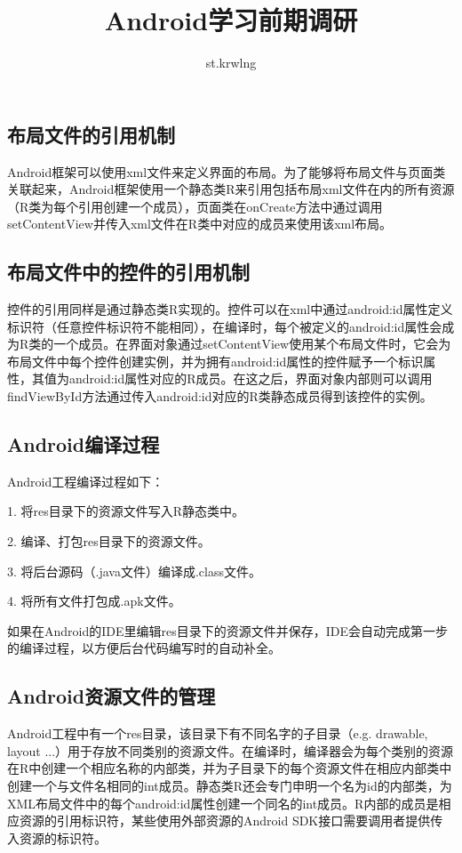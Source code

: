 \documentclass[UTF8]{ctexart}
\title{Android学习前期调研}
\author{st.krwlng}
\begin{document}
	\maketitle
	\tableofcontents
	\subsection{布局文件的引用机制} Android框架可以使用xml文件来定义界面的布局。为了能够将布局文件与页面类关联起来，Android框架使用一个静态类R来引用包括布局xml文件在内的所有资源（R类为每个引用创建一个成员），页面类在onCreate方法中通过调用setContentView并传入xml文件在R类中对应的成员来使用该xml布局。
	\subsection{布局文件中的控件的引用机制} 控件的引用同样是通过静态类R实现的。控件可以在xml中通过android:id属性定义标识符（任意控件标识符不能相同），在编译时，每个被定义的android:id属性会成为R类的一个成员。在界面对象通过setContentView使用某个布局文件时，它会为布局文件中每个控件创建实例，并为拥有android:id属性的控件赋予一个标识属性，其值为android:id属性对应的R成员。在这之后，界面对象内部则可以调用findViewById方法通过传入android:id对应的R类静态成员得到该控件的实例。
	\subsection{Android编译过程} Android工程编译过程如下：

	{1.} 将res目录下的资源文件写入R静态类中。

	{2.} 编译、打包res目录下的资源文件。

	{3.} 将后台源码（.java文件）编译成.class文件。

	{4.} 将所有文件打包成.apk文件。
	
	如果在Android的IDE里编辑res目录下的资源文件并保存，IDE会自动完成第一步的编译过程，以方便后台代码编写时的自动补全。
	\subsection{Android资源文件的管理} Android工程中有一个res目录，该目录下有不同名字的子目录（e.g. drawable, layout ...）用于存放不同类别的资源文件。在编译时，编译器会为每个类别的资源在R中创建一个相应名称的内部类，并为子目录下的每个资源文件在相应内部类中创建一个与文件名相同的int成员。静态类R还会专门申明一个名为id的内部类，为XML布局文件中的每个android:id属性创建一个同名的int成员。R内部的成员是相应资源的引用标识符，某些使用外部资源的Android SDK接口需要调用者提供传入资源的标识符。
\end{document}
